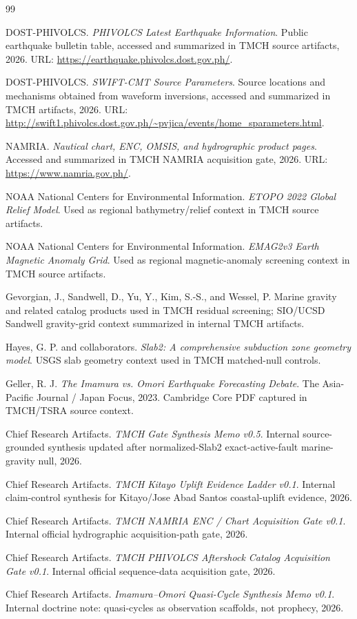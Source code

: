 \documentclass[11pt]{article}
\begin{document}
\begin{thebibliography}{99}

DOST-PHIVOLCS. \emph{PHIVOLCS Latest Earthquake Information}. Public earthquake bulletin table, accessed and summarized in TMCH source artifacts, 2026. URL: \url{https://earthquake.phivolcs.dost.gov.ph/}.

DOST-PHIVOLCS. \emph{SWIFT-CMT Source Parameters}. Source locations and mechanisms obtained from waveform inversions, accessed and summarized in TMCH artifacts, 2026. URL: \url{http://swift1.phivolcs.dost.gov.ph/~pvjica/events/home_sparameters.html}.

NAMRIA. \emph{Nautical chart, ENC, OMSIS, and hydrographic product pages}. Accessed and summarized in TMCH NAMRIA acquisition gate, 2026. URL: \url{https://www.namria.gov.ph/}.

NOAA National Centers for Environmental Information. \emph{ETOPO 2022 Global Relief Model}. Used as regional bathymetry/relief context in TMCH source artifacts.

NOAA National Centers for Environmental Information. \emph{EMAG2v3 Earth Magnetic Anomaly Grid}. Used as regional magnetic-anomaly screening context in TMCH source artifacts.

Gevorgian, J., Sandwell, D., Yu, Y., Kim, S.-S., and Wessel, P. Marine gravity and related catalog products used in TMCH residual screening; SIO/UCSD Sandwell gravity-grid context summarized in internal TMCH artifacts.

Hayes, G. P. and collaborators. \emph{Slab2: A comprehensive subduction zone geometry model}. USGS slab geometry context used in TMCH matched-null controls.

Geller, R. J. \emph{The Imamura vs. Omori Earthquake Forecasting Debate}. The Asia-Pacific Journal / Japan Focus, 2023. Cambridge Core PDF captured in TMCH/TSRA source context.

Chief Research Artifacts. \emph{TMCH Gate Synthesis Memo v0.5}. Internal source-grounded synthesis updated after normalized-Slab2 exact-active-fault marine-gravity null, 2026.

Chief Research Artifacts. \emph{TMCH Kitayo Uplift Evidence Ladder v0.1}. Internal claim-control synthesis for Kitayo/Jose Abad Santos coastal-uplift evidence, 2026.

Chief Research Artifacts. \emph{TMCH NAMRIA ENC / Chart Acquisition Gate v0.1}. Internal official hydrographic acquisition-path gate, 2026.

Chief Research Artifacts. \emph{TMCH PHIVOLCS Aftershock Catalog Acquisition Gate v0.1}. Internal official sequence-data acquisition gate, 2026.

Chief Research Artifacts. \emph{Imamura--Omori Quasi-Cycle Synthesis Memo v0.1}. Internal doctrine note: quasi-cycles as observation scaffolds, not prophecy, 2026.

\end{thebibliography}
\end{document}
